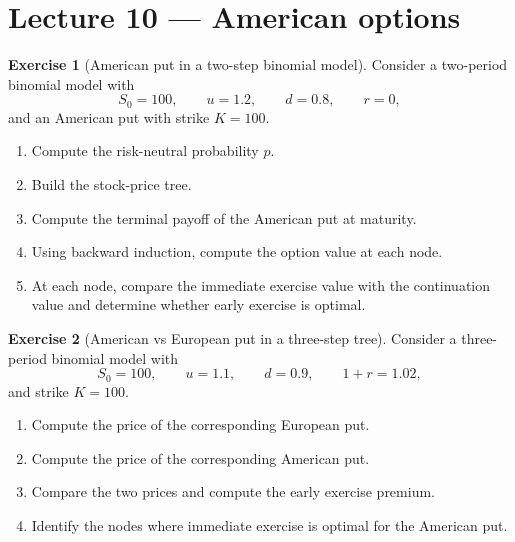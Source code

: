 \documentclass[11pt]{article}
\newcommand{\1}{\mathbf{1}}
\theoremstyle{definition}
\newtheorem{exercise}{Exercise}[section]
\begin{document}

\section{Lecture 10 --- American options}


\begin{exercise}[American put in a two-step binomial model]
Consider a two-period binomial model with
\[
S_0=100,\qquad u=1.2,\qquad d=0.8,\qquad r=0,
\]
and an American put with strike \(K=100\).

\begin{enumerate}[leftmargin=1.6em]
\item Compute the risk-neutral probability \(p\).

\item Build the stock-price tree.

\item Compute the terminal payoff of the American put at maturity.

\item Using backward induction, compute the option value at each node.

\item At each node, compare the immediate exercise value with the continuation value and determine whether early exercise is optimal.
\end{enumerate}
\end{exercise}


\begin{exercise}[American vs European put in a three-step tree]
Consider a three-period binomial model with
\[
S_0=100,\qquad u=1.1,\qquad d=0.9,\qquad 1+r=1.02,
\]
and strike \(K=100\).

\begin{enumerate}[leftmargin=1.6em]
\item Compute the price of the corresponding European put.

\item Compute the price of the corresponding American put.

\item Compare the two prices and compute the early exercise premium.

\item Identify the nodes where immediate exercise is optimal for the American put.
\end{enumerate}
\end{exercise}
\end{document}

